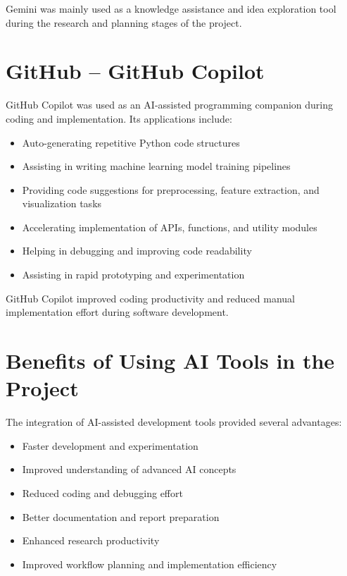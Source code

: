 \documentclass[12pt,a4paper]{report}
\begin{document}
Gemini was mainly used as a knowledge assistance and idea exploration tool during the research and planning stages of the project.

\section{GitHub -- GitHub Copilot}

GitHub Copilot was used as an AI-assisted programming companion during coding and implementation. Its applications include:

\begin{itemize}
    \item Auto-generating repetitive Python code structures
    \item Assisting in writing machine learning model training pipelines
    \item Providing code suggestions for preprocessing, feature extraction, and visualization tasks
    \item Accelerating implementation of APIs, functions, and utility modules
    \item Helping in debugging and improving code readability
    \item Assisting in rapid prototyping and experimentation
\end{itemize}

GitHub Copilot improved coding productivity and reduced manual implementation effort during software development.

\section{Benefits of Using AI Tools in the Project}

The integration of AI-assisted development tools provided several advantages:

\begin{itemize}
    \item Faster development and experimentation
    \item Improved understanding of advanced AI concepts
    \item Reduced coding and debugging effort
    \item Better documentation and report preparation
    \item Enhanced research productivity
    \item Improved workflow planning and implementation efficiency
\end{itemize}
\end{document}
